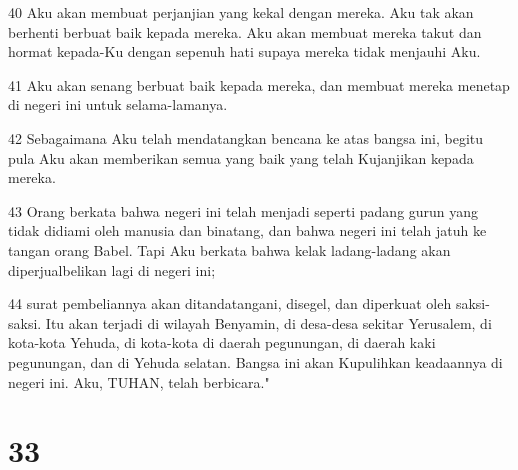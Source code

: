 \par 40 Aku akan membuat perjanjian yang kekal dengan mereka. Aku tak akan berhenti berbuat baik kepada mereka. Aku akan membuat mereka takut dan hormat kepada-Ku dengan sepenuh hati supaya mereka tidak menjauhi Aku.
\par 41 Aku akan senang berbuat baik kepada mereka, dan membuat mereka menetap di negeri ini untuk selama-lamanya.
\par 42 Sebagaimana Aku telah mendatangkan bencana ke atas bangsa ini, begitu pula Aku akan memberikan semua yang baik yang telah Kujanjikan kepada mereka.
\par 43 Orang berkata bahwa negeri ini telah menjadi seperti padang gurun yang tidak didiami oleh manusia dan binatang, dan bahwa negeri ini telah jatuh ke tangan orang Babel. Tapi Aku berkata bahwa kelak ladang-ladang akan diperjualbelikan lagi di negeri ini;
\par 44 surat pembeliannya akan ditandatangani, disegel, dan diperkuat oleh saksi-saksi. Itu akan terjadi di wilayah Benyamin, di desa-desa sekitar Yerusalem, di kota-kota Yehuda, di kota-kota di daerah pegunungan, di daerah kaki pegunungan, dan di Yehuda selatan. Bangsa ini akan Kupulihkan keadaannya di negeri ini. Aku, TUHAN, telah berbicara."

\chapter{33}

